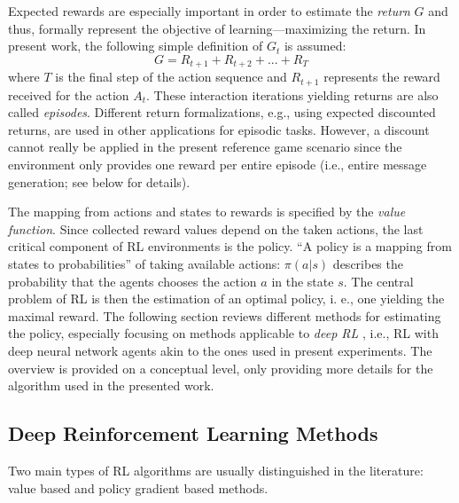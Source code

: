 Expected rewards are especially important in order to estimate the \textit{return} $G$ and thus, formally represent the objective of learning---maximizing the return. In present work, the following simple definition of $G_t$ is assumed: 
\begin{equation}
G = R_{t+1} + R_{t+2} + ... + R_T
\end{equation}
where $T$ is the final step of the action sequence and $R_{t+1}$ represents the reward received for the action $A_t$. These interaction iterations yielding returns are also called \textit{episodes}. Different return formalizations, e.g., using expected discounted returns, are used in other applications for episodic tasks. However, a discount cannot really be applied in the present reference game scenario since the environment only provides one reward per entire episode (i.e., entire message generation; see below for details).

The mapping from actions and states to rewards is specified by the \textit{value function}. Since collected reward values depend on the taken actions, the last critical component of RL environments is the policy. ``A policy is a mapping from states to probabilities'' of taking available actions: $\pi(a | s)$ describes the probability that the agents chooses the action $a$ in the state $s$. The central problem of RL is then the estimation of an optimal policy, i. e., one yielding the maximal reward. The following section reviews different methods for estimating the policy, especially focusing on methods applicable to \textit{deep RL} \parencite{lecun2015deep}, i.e., RL with deep neural network agents akin to the ones used in present experiments. The overview is provided on a conceptual level, only providing more details for the algorithm used in the presented work.

\subsection{Deep Reinforcement Learning Methods}
\label{rl_methods}
Two main types of RL algorithms are usually distinguished in the literature: value based and policy gradient based methods. 

